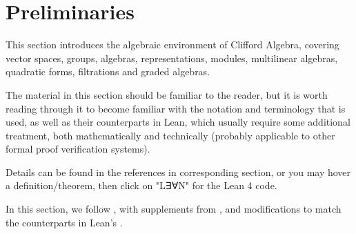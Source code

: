 \section{Preliminaries}
\label{cha:preliminaries}

This section introduces the algebraic environment of Clifford Algebra,
covering vector spaces, groups, algebras, representations, modules, multilinear algebras,
quadratic forms, filtrations and graded algebras.

The material in this section should be familiar to the reader, but it is worth reading
 through it to become familiar with the notation and terminology that is used,
 as well as their counterparts in Lean, which usually require some additional treatment, both
 mathematically and technically (probably applicable to other formal proof verification systems).

Details can be found in the references in corresponding section, or you may hover a definition/theorem,
then click on "L∃∀N" for the Lean 4 code.

In this section, we follow \cite{jadczyk2019notes}, with supplements from \cite{garling2011clifford, chen2016infinitely}, 
and modifications to match the counterparts in Lean's \Mathlib.

